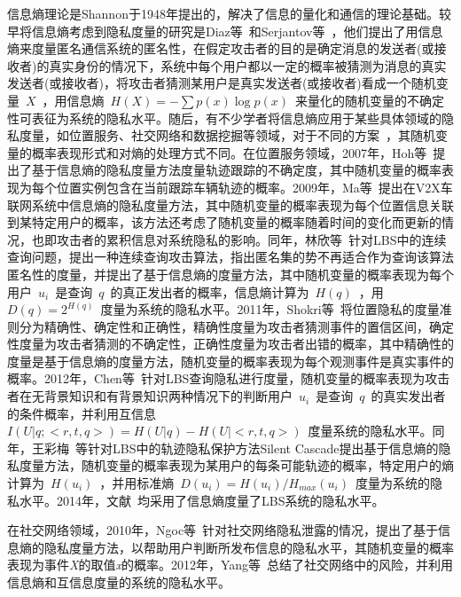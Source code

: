 信息熵理论是Shannon于1948年提出的，解决了信息的量化和通信的理论基础。较早将信息熵考虑到隐私度量的研究是Diaz等~\cite{diaz2002towards}和Serjantov等~\cite{serjantov2002towards}，他们提出了用信息熵来度量匿名通信系统的匿名性，在假定攻击者的目的是确定消息的发送者(或接收者)的真实身份的情况下，系统中每个用户都以一定的概率被猜测为消息的真实发送者(或接收者)，将攻击者猜测某用户是真实发送者(或接收者)看成一个随机变量~$X$~，用信息熵~$H(X)=-\sum p(x)\log p(x)$~来量化的随机变量的不确定性可表征为系统的隐私水平。随后，有不少学者将信息熵应用于某些具体领域的隐私度量，如位置服务、社交网络和数据挖掘等领域，对于不同的方案~\cite{serjantov2002towards,shokri2011quantifying,wang2012location}，其随机变量的概率表现形式和对熵的处理方式不同。在位置服务领域，2007年，Hoh等~\cite{hoh2007preserving}提出了基于信息熵的隐私度量方法度量轨迹跟踪的不确定度，其中随机变量的概率表现为每个位置实例包含在当前跟踪车辆轨迹的概率。2009年，Ma等~\cite{ma2009measuring}提出在V2X车联网系统中信息熵的隐私度量方法，其中随机变量的概率表现为每个位置信息关联到某特定用户的概率，该方法还考虑了随机变量的概率随着时间的变化而更新的情况，也即攻击者的累积信息对系统隐私的影响。同年，林欣等~\cite{lin2009lbs}针对LBS中的连续查询问题，提出一种连续查询攻击算法，指出匿名集的势不再适合作为查询该算法匿名性的度量，并提出了基于信息熵的度量方法，其中随机变量的概率表现为每个用户~$u_{i}$~是查询~$q$~的真正发出者的概率，信息熵计算为~$H(q)$~，用~$D(q)=2^{H(q)}$~度量为系统的隐私水平。2011年，Shokri等~\cite{shokri2011quantifying}将位置隐私的度量准则分为精确性、确定性和正确性，精确性度量为攻击者猜测事件的置信区间，确定性度量为攻击者猜测的不确定性，正确性度量为攻击者出错的概率，其中精确性的度量是基于信息熵的度量方法，随机变量的概率表现为每个观测事件是真实事件的概率。2012年，Chen等~\cite{chen2012measuring}针对LBS查询隐私进行度量，随机变量的概率表现为攻击者在无背景知识和有背景知识两种情况下的判断用户~$u_{i}$~是查询~$q$~的真实发出者的条件概率，并利用互信息~$I(U|q;<r,t,q>)=H(U|q)-H(U|<r,t,q>)$~度量系统的隐私水平。同年，王彩梅~\cite{wang2012location}等针对LBS中的轨迹隐私保护方法Silent Cascade提出基于信息熵的隐私度量方法，随机变量的概率表现为某用户的每条可能轨迹的概率，特定用户的熵计算为~$H(u_{i})$~，并用标准熵~$D(u_{i})=H(u_{i})/H_{max}(u_{i})$~度量为系统的隐私水平。2014年，文献~\cite{niu2014achieving,olteanu2017quantifying}均采用了信息熵度量了LBS系统的隐私水平。

在社交网络领域，2010年，Ngoc等~\cite{ngoc2010new}针对社交网络隐私泄露的情况，提出了基于信息熵的隐私度量方法，以帮助用户判断所发布信息的隐私水平，其随机变量的概率表现为事件\textit{X}的取值\textit{x}的概率。2012年，Yang等~\cite{yang2012stalking}总结了社交网络中的风险，并利用信息熵和互信息度量的系统的隐私水平。

